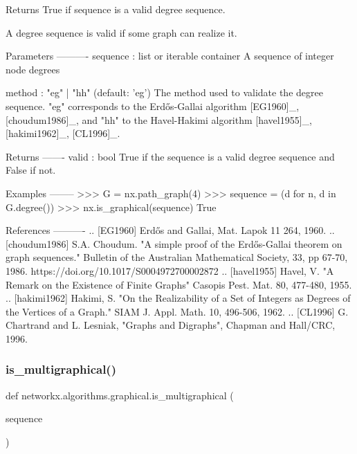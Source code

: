 \begin{DoxyVerb}Returns True if sequence is a valid degree sequence.

A degree sequence is valid if some graph can realize it.

Parameters
----------
sequence : list or iterable container
    A sequence of integer node degrees

method : "eg" | "hh"  (default: 'eg')
    The method used to validate the degree sequence.
    "eg" corresponds to the Erdős-Gallai algorithm
    [EG1960]_, [choudum1986]_, and
    "hh" to the Havel-Hakimi algorithm
    [havel1955]_, [hakimi1962]_, [CL1996]_.

Returns
-------
valid : bool
    True if the sequence is a valid degree sequence and False if not.

Examples
--------
>>> G = nx.path_graph(4)
>>> sequence = (d for n, d in G.degree())
>>> nx.is_graphical(sequence)
True

References
----------
.. [EG1960] Erdős and Gallai, Mat. Lapok 11 264, 1960.
.. [choudum1986] S.A. Choudum. "A simple proof of the Erdős-Gallai theorem on
   graph sequences." Bulletin of the Australian Mathematical Society, 33,
   pp 67-70, 1986. https://doi.org/10.1017/S0004972700002872
.. [havel1955] Havel, V. "A Remark on the Existence of Finite Graphs"
   Casopis Pest. Mat. 80, 477-480, 1955.
.. [hakimi1962] Hakimi, S. "On the Realizability of a Set of Integers as
   Degrees of the Vertices of a Graph." SIAM J. Appl. Math. 10, 496-506, 1962.
.. [CL1996] G. Chartrand and L. Lesniak, "Graphs and Digraphs",
   Chapman and Hall/CRC, 1996.
\end{DoxyVerb}
 \mbox{\label{namespacenetworkx_1_1algorithms_1_1graphical_ad8f62b18333b9b46eb158b4ea15b9a8c}} 
\subsubsection{\texorpdfstring{is\+\_\+multigraphical()}{is\_multigraphical()}}
{\footnotesize\ttfamily def networkx.\+algorithms.\+graphical.\+is\+\_\+multigraphical (\begin{DoxyParamCaption}\item[{}]{sequence }\end{DoxyParamCaption})}


